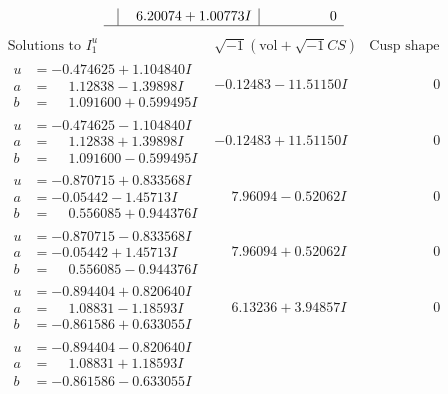 \documentclass[1p]{elsarticle_modified}
\theoremstyle{definition}
\newcommand{\I}{\sqrt{-1}}
\begin{document}
$$\begin{array}{c|c|c}
 & \phantom{-}6.20074 + 1.00773 I & \phantom{-0.000000 } 0\\
 \hline 
 \end{array}$$\newpage$$\begin{array}{c|c|c}  
\text{Solutions to }I^u_{1}& \I (\text{vol} + \sqrt{-1}CS) & \text{Cusp shape}\\
 \hline 
\begin{aligned}
u &= -0.474625 + 1.104840 I \\
a &= \phantom{-}1.12838 - 1.39898 I \\
b &= \phantom{-}1.091600 + 0.599495 I\end{aligned}
 & -0.12483 - 11.51150 I & \phantom{-0.000000 } 0 \\ \hline\begin{aligned}
u &= -0.474625 - 1.104840 I \\
a &= \phantom{-}1.12838 + 1.39898 I \\
b &= \phantom{-}1.091600 - 0.599495 I\end{aligned}
 & -0.12483 + 11.51150 I & \phantom{-0.000000 } 0 \\ \hline\begin{aligned}
u &= -0.870715 + 0.833568 I \\
a &= -0.05442 - 1.45713 I \\
b &= \phantom{-}0.556085 + 0.944376 I\end{aligned}
 & \phantom{-}7.96094 - 0.52062 I & \phantom{-0.000000 } 0 \\ \hline\begin{aligned}
u &= -0.870715 - 0.833568 I \\
a &= -0.05442 + 1.45713 I \\
b &= \phantom{-}0.556085 - 0.944376 I\end{aligned}
 & \phantom{-}7.96094 + 0.52062 I & \phantom{-0.000000 } 0 \\ \hline\begin{aligned}
u &= -0.894404 + 0.820640 I \\
a &= \phantom{-}1.08831 - 1.18593 I \\
b &= -0.861586 + 0.633055 I\end{aligned}
 & \phantom{-}6.13236 + 3.94857 I & \phantom{-0.000000 } 0 \\ \hline\begin{aligned}
u &= -0.894404 - 0.820640 I \\
a &= \phantom{-}1.08831 + 1.18593 I \\
b &= -0.861586 - 0.633055 I\end{aligned}

\end{array}$$
\end{document}
